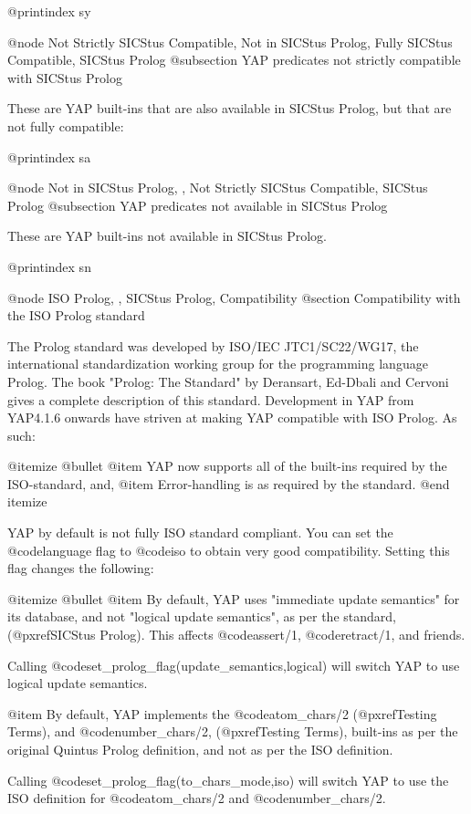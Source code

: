 {{{{{{{{{@printindex sy

@node Not Strictly SICStus Compatible, Not in SICStus Prolog, Fully SICStus Compatible, SICStus Prolog
@subsection YAP predicates not strictly compatible with SICStus Prolog

These are YAP built-ins that are also available in SICStus Prolog, but
that are not fully compatible:

@printindex sa

@node Not in SICStus Prolog, , Not Strictly SICStus Compatible, SICStus Prolog
@subsection YAP predicates not available in SICStus Prolog

These are YAP built-ins not available in SICStus Prolog.

@printindex sn


@node ISO Prolog, , SICStus Prolog, Compatibility
@section Compatibility with the ISO Prolog standard

The Prolog standard was developed by ISO/IEC JTC1/SC22/WG17, the
international standardization working group for the programming language
Prolog. The book "Prolog: The Standard" by Deransart, Ed-Dbali and
Cervoni gives a complete description of this standard. Development in
YAP from YAP4.1.6 onwards have striven at making YAP
compatible with ISO Prolog. As such:

@itemize @bullet
@item   YAP now supports all of the built-ins required by the
ISO-standard, and,
@item   Error-handling is as required by the standard.
@end itemize

YAP by default is not fully ISO standard compliant. You can set the 
@code{language} flag to @code{iso} to obtain very good
compatibility. Setting this flag changes the following:

@itemize @bullet
@item By default, YAP uses "immediate update semantics" for its
database, and not "logical update semantics", as per the standard,
(@pxref{SICStus Prolog}). This affects @code{assert/1},
@code{retract/1}, and friends.

Calling @code{set_prolog_flag(update_semantics,logical)} will switch
YAP to use logical update semantics.

@item By default, YAP implements the @code{atom_chars/2}
(@pxref{Testing Terms}), and @code{number_chars/2}, (@pxref{Testing
Terms}), built-ins as per the original Quintus Prolog definition, and
not as per the ISO definition.

Calling @code{set_prolog_flag(to_chars_mode,iso)} will switch
YAP to use the ISO definition for
@code{atom_chars/2} and @code{number_chars/2}.

}}}}}}}}}
